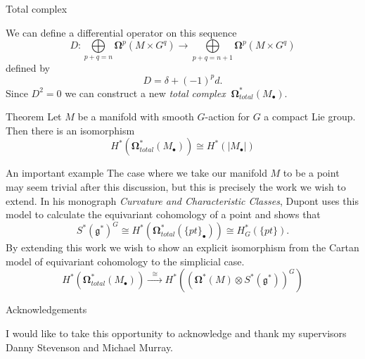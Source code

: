 \documentclass{beamer}
\newcommand{\omg}[1]{\boldsymbol{\Omega}^{#1}}
\begin{document}
\begin{frame}{Total complex}

\begin{center}
\end{center}

We can define a differential operator on this sequence
\[
D:\bigoplus\limits_{p+q=n}\omg{p}(M\times G^q) \xrightarrow{~~~~} \bigoplus\limits_{p+q=n+1}\omg{p}(M\times G^{q})
\]
defined by
\[
D = \delta + (-1)^{p}d.
\]
Since $D^2 = 0$ we can construct a new \emph{total complex} $~\omg{*}_{total}(M_{\bullet})$.

\begin{block}{Theorem}
Let $M$ be a manifold with smooth $G$-action for $G$ a compact Lie group. Then there is an isomorphism
\[
H^{*}(\omg{*}_{total}(M_{\bullet})) \cong H^{*}(|M_{\bullet}|)
\]
\end{block}
\end{frame}



\begin{frame}{An important example}
The case where we take our manifold $M$ to be a point may seem trivial after this discussion, but this is precisely the work we wish to extend. In his monograph \emph{Curvature and Characteristic Classes}, Dupont uses this model to calculate the equivariant cohomology of a point and shows that
\[
S^{*}(\mathfrak{g}^{*})^G \cong H^*(\omg{*}_{total}(\{pt\}_{\bullet})) \cong H^{*}_G(\{pt\}).
\]
By extending this work we wish to show an explicit isomorphism from the Cartan model of equivariant cohomology to the simplicial case.
\[
H^{*}(\omg{*}_{total}(M_{\bullet})) \xrightarrow{~~~\cong~~~} H^{*}((\omg{*}(M) \otimes S^{*}(\mathfrak{g}^{*}))^G)
\]
\end{frame}



\begin{frame}{Acknowledgements}
\begin{center}
I would like to take this opportunity to acknowledge and thank my supervisors Danny Stevenson and Michael Murray.
\end{center}
\end{frame}
\end{document}
